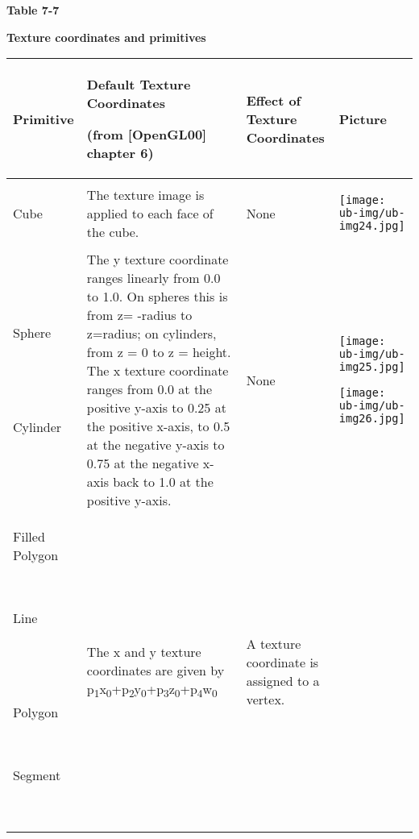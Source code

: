 \begin{center}
{\sffamily\bfseries Table 7-7}

{\sffamily\bfseries Texture coordinates and primitives}

\tablehead{}
\begin{xtabular}{|m{0.712in}|m{3.36in}|m{0.9in}|m{0.7in}|}
\hline
Primitive &
Default Texture Coordinates

(from [OpenGL00] chapter 6) &
Effect of Texture Coordinates &
Picture\\\hline
Cube &
The texture image is applied to each face of the cube.  &
None &
\begin{center}
\texttt{[image: ub-img/ub-img24.jpg]}
\end{center}
\\\hline
Sphere

~

~

Cylinder &
The y texture coordinate ranges linearly from 0.0 to 1.0. On spheres
this is from\newline
z= -radius to z=radius; on cylinders, from\newline
z = 0 to z = height. The x texture coordinate ranges from 0.0 at the
positive y-axis to 0.25 at the positive x-axis, to 0.5 at the
negative\newline
y-axis to 0.75 at the negative x-axis back to 1.0 at the positive
y-axis.  &
None &


\begin{center}
\texttt{[image: ub-img/ub-img25.jpg]}
\end{center}
\begin{center}
\texttt{[image: ub-img/ub-img26.jpg]}
\end{center}
\\\hline
Filled Polygon

~

Line

~

~

Polygon

~

Segment

~
 &
The x and y texture coordinates are given by
p\textsubscript{1}x\textsubscript{0}+p\textsubscript{2}y\textsubscript{0}+p\textsubscript{3}z\textsubscript{0}+p\textsubscript{4}w\textsubscript{0}
 &
A texture coordinate is assigned to a vertex.  &



\end{xtabular}
\end{center}
